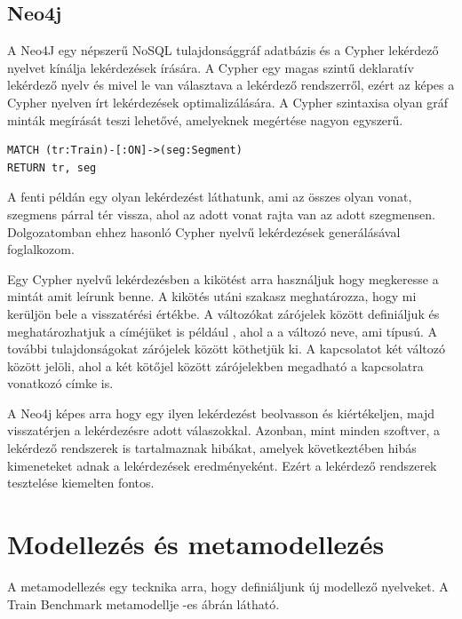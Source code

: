 
 
\subsection{Neo4j}

A Neo4J egy népszerű NoSQL tulajdonsággráf adatbázis és a Cypher lekérdező nyelvet kínálja lekérdezések írására. A Cypher egy magas szintű deklaratív lekérdező nyelv és mivel le van választava a lekérdező rendszerről, ezért az képes a Cypher nyelven írt lekérdezések optimalizálására. A Cypher szintaxisa olyan gráf minták megírását teszi lehetővé, amelyeknek megértése nagyon egyszerű.


\begin{lstlisting}[style=cyphersmall]
MATCH (tr:Train)-[:ON]->(seg:Segment)
RETURN tr, seg	
\end{lstlisting}   

A fenti példán egy olyan lekérdezést láthatunk,  ami az összes olyan vonat, szegmens párral tér vissza, ahol az adott vonat rajta van az adott szegmensen. Dolgozatomban ehhez hasonló Cypher nyelvű lekérdezések generálásával foglalkozom.

Egy Cypher nyelvű lekérdezésben a  kikötést arra használjuk hogy megkeresse a mintát amit leírunk benne.
A  kikötés utáni szakasz meghatározza, hogy mi kerüljön bele a visszatérési értékbe.    A változókat \cypherStyle{()} zárójelek között definiáljuk és meghatározhatjuk a címéjüket is például , ahol a  a változó neve, ami  típusú.  A további tulajdonságokat \cypherStyle{\{\}} zárójelek között köthetjük ki. A kapcsolatot két változó között \cypherStyle{-->} jelöli, ahol a két kötőjel között \cypherStyle{[]} zárójelekben megadható a kapcsolatra vonatkozó címke is. 

A Neo4j képes arra hogy egy ilyen lekérdezést beolvasson és kiértékeljen, majd visszatérjen a lekérdezésre adott válaszokkal. Azonban, mint minden szoftver, a lekérdező rendszerek is tartalmaznak hibákat, amelyek következtében hibás kimeneteket adnak a lekérdezések eredményeként. Ezért a lekérdező rendszerek tesztelése kiemelten fontos.

\section{Modellezés és metamodellezés}

A metamodellezés egy tecknika arra, hogy definiáljunk új modellező nyelveket. A Train Benchmark metamodellje  -es ábrán látható.

